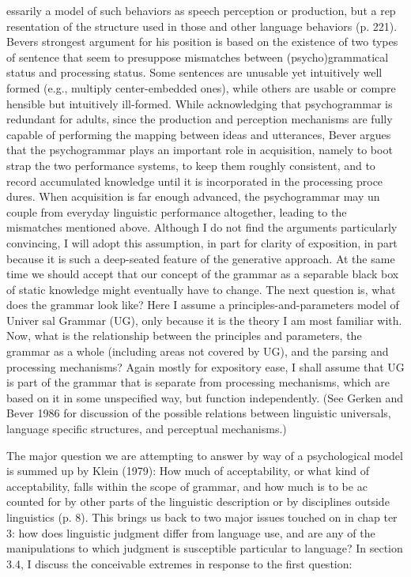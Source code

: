 \clearpage\setcounter{page}{1}\begin{styleTextbody}
essarily a model of such behaviors as speech perception or production, but a rep\- resentation of the structure used in those and other language behaviors{\textquotedbl} (p. 221). Bever{\textquotesingle}s strongest argument for his position is based on the existence of two types of sentence that seem to presuppose mismatches between (psycho)grammatical status and processing status. Some sentences are unusable yet intuitively well\- formed (e.g., multiply center-embedded ones), while others are usable or compre\- hensible but intuitively ill-formed. While acknowledging that psychogrammar is redundant for adults, since the production and perception mechanisms are fully capable of performing the mapping between ideas and utterances, Bever argues that the psychogrammar plays an important role in acquisition, namely to boot\- strap the two performance systems, to keep them roughly consistent, and to record accumulated knowledge until it is incorporated in the processing proce\- dures. When acquisition is far enough advanced, the psychogrammar may un\- couple from everyday linguistic performance altogether, leading to the mismatches mentioned above. Although I do not find the arguments particularly convincing, I will adopt this assumption, in part for clarity of exposition, in part because it is such a deep-seated feature of the generative approach. At the same time we should accept that our concept of the grammar as a separable black box of static knowledge might eventually have to change. The next question is, what does the grammar look like? Here I assume a principles-and-parameters model of Univer\- sal Grammar (UG), only because it is the theory I am most familiar with. Now, what is the relationship between the principles and parameters, the grammar as a whole (including areas not covered by UG), and the parsing and processing mechanisms? Again mostly for expository ease, I shall assume that UG is part of the grammar that is separate from processing mechanisms, which are based on it in some unspecified way, but function independently. (See Gerken and Bever 1986 for discussion of the possible relations between linguistic universals, language\- specific structures, and perceptual mechanisms.)
\end{styleTextbody}


\begin{styleTextbody}
The major question we are attempting to answer by way of a psychological model is summed up by Klein (1979): {\textquotedbl}How much of acceptability, or what kind of acceptability, falls within the scope of grammar, and how much is to be ac\- counted for by other parts of the linguistic description or by disciplines outside linguistics{\textquotedbl} (p. 8). This brings us back to two major issues touched on in chap\- ter 3: how does linguistic judgment differ from language use, and are any of the manipulations to which judgment is susceptible particular to language? In section 3.4, I discuss the conceivable extremes in response to the first question:
\end{styleTextbody}


